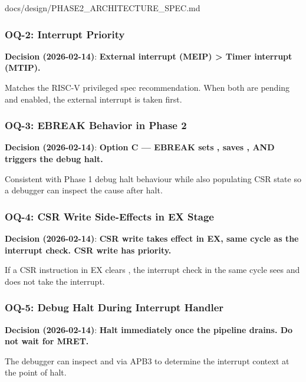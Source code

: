 \begin{relocated}{docs/design/PHASE2_ARCHITECTURE_SPEC.md}
\subsubsection{OQ-2: Interrupt Priority}\label{ds:ch:phase2-architecture:oq-2-interrupt-priority}

\textbf{Decision (2026-02-14)}: \ok{} \textbf{External interrupt (MEIP)
\textgreater{} Timer interrupt (MTIP).}

Matches the RISC-V privileged spec recommendation. When both are pending
and enabled, the external interrupt is taken first.

\subsubsection{OQ-3: EBREAK Behavior in Phase 2}\label{ds:ch:phase2-architecture:oq-3-ebreak-behavior-in-phase-2}

\textbf{Decision (2026-02-14)}: \ok{} \textbf{Option C --- EBREAK sets
, saves , AND triggers the debug halt.}

Consistent with Phase 1 debug halt behaviour while also populating CSR
state so a debugger can inspect the cause after halt.

\subsubsection{OQ-4: CSR Write Side-Effects in EX Stage}\label{ds:ch:phase2-architecture:oq-4-csr-write-side-effects-in-ex-stage}

\textbf{Decision (2026-02-14)}: \ok{} \textbf{CSR write takes effect in
EX, same cycle as the interrupt check. CSR write has priority.}

If a CSR instruction in EX clears , the interrupt
check in the same cycle sees  and does not take the
interrupt.

\subsubsection{OQ-5: Debug Halt During Interrupt Handler}\label{ds:ch:phase2-architecture:oq-5-debug-halt-during-interrupt-handler}

\textbf{Decision (2026-02-14)}: \ok{} \textbf{Halt immediately once the
pipeline drains. Do not wait for MRET.}

The debugger can inspect  and  via APB3 to
determine the interrupt context at the point of halt.


\end{relocated}
